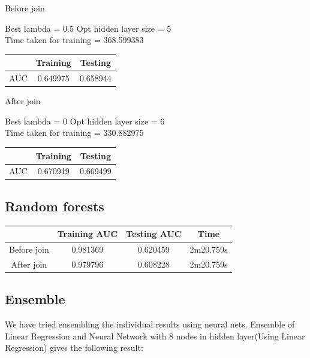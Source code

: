 \documentclass[10pt]{article}
\begin{document}
Before join

	Best lambda = 0.5 Opt hidden layer size = 5 
\\

	Time taken for training = 368.599383

\begin{center}
 \begin{tabular}{|c | c | c ||} 
 \hline
 & Training & Testing\\ [0.5ex] 
 \hline\hline
AUC & 0.649975 & 0.658944\\
 \hline
\end{tabular}
\end{center}

After join

	Best lambda = 0 Opt hidden layer size = 6 
\\
	Time taken for training = 330.882975
\\
\begin{center}
 \begin{tabular}{|c | c | c ||} 
 \hline
 & Training & Testing\\ [0.5ex] 
 \hline\hline
AUC & 0.670919 & 0.669499\\
 \hline
\end{tabular}
\end{center}


\subsection{Random forests}

\begin{center}
 \begin{tabular}{|c | c | c | c||} 
 \hline
 & Training AUC & Testing AUC & Time\\ [0.5ex] 
 \hline\hline
Before join & 0.981369 & 0.620459 & 2m20.759s\\
 \hline
After join & 0.979796 & 0.608228 & 2m20.759s\\ 
 \hline
\end{tabular}
\end{center}

\subsection{Ensemble}
We have tried ensembling the individual results using neural nets. Ensemble of Linear Regression and Neural Network with 8 nodes in hidden layer(Using Linear Regression) gives the following result:\\
\end{document}
